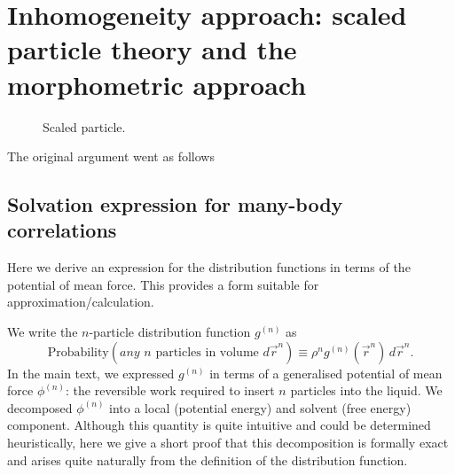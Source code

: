 \documentclass[12pt]{report}
\begin{document}
\section{Inhomogeneity approach: scaled particle theory and the morphometric approach}

\begin{figure}
  \missingfigure[figwidth=\linewidth]{}
  \caption{Scaled particle.}
\end{figure}

The original argument went as follows

\subsection{Solvation expression for many-body correlations}

Here we derive an expression for the distribution functions in terms of the potential of mean force.
This provides a form suitable for approximation/calculation.

We write the $n$-particle distribution function $g^{(n)}$ as
\begin{equation}\label{eq:n-density-pdf}
  \textrm{Probability}\left( \textit{any } n \textrm{ particles in volume } d\vec{r}^n \right)
  \equiv
  \rho^n g^{(n)}(\vec{r}^n) \, d\vec{r}^n.
\end{equation}
In the main text, we expressed $g^{(n)}$ in terms of a generalised potential of mean force $\phi^{(n)}$: the reversible work required to insert $n$ particles into the liquid.
We decomposed $\phi^{(n)}$ into a local (potential energy) and solvent (free energy) component.
Although this quantity is quite intuitive and could be determined heuristically, here we give a short proof that this decomposition is formally exact and arises quite naturally from the definition of the distribution function.
\end{document}
